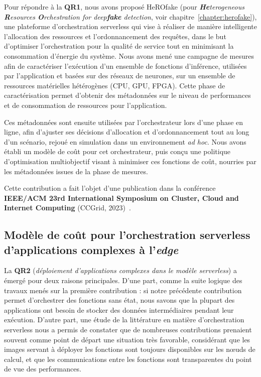 \sloppy Pour répondre à la \textbf{QR1}, nous avons proposé HeROfake (pour \textit{\textbf{He}terogeneous \textbf{R}esources \textbf{O}rchestration for deep\textbf{fake} detection}, voir chapitre~\ref{chapter:herofake}), une plateforme d'orchestration serverless qui vise à réaliser de manière intelligente l'allocation des ressources et l'ordonnancement des requêtes, dans le but d'optimiser l'orchestration pour la qualité de service tout en minimisant la consommation d'énergie du système. Nous avons mené une campagne de mesures afin de caractériser l'exécution d'un ensemble de fonctions d'inférence, utilisées par l'application et basées sur des réseaux de neurones, sur un ensemble de ressources matérielles hétérogènes (CPU, GPU, FPGA). Cette phase de caractérisation permet d'obtenir des métadonnées sur le niveau de performances et de consommation de ressources pour l'application.

Ces métadonnées sont ensuite utilisées par l'orchestrateur lors d'une phase en ligne, afin d'ajuster ses décisions d'allocation et d'ordonnancement tout au long d'un scénario, rejoué en simulation dans un environnement \textit{ad hoc}. Nous avons établi un modèle de coût pour cet orchestrateur, puis conçu une politique d'optimisation multiobjectif visant à minimiser ces fonctions de coût, nourries par les métadonnées issues de la phase de mesures.

Cette contribution a fait l'objet d'une publication dans la conférence \textbf{IEEE/ACM 23rd International Symposium on Cluster, Cloud and Internet Computing} (CCGrid, 2023)~\cite{herofake}.

\subsection{Modèle de coût pour l'orchestration serverless d'applications complexes à l'\textit{edge}}

La \textbf{QR2} (\textit{déploiement d'applications complexes dans le modèle serverless}) a émergé pour deux raisons principales. D'une part, comme la suite logique des travaux menés sur la première contribution : si notre précédente contribution permet d'orchestrer des fonctions sans état, nous savons que la plupart des applications ont besoin de stocker des données intermédiaires pendant leur exécution. D'autre part, une étude de la littérature en matière d'orchestration serverless nous a permis de constater que de nombreuses contributions prenaient souvent comme point de départ une situation très favorable, considérant que les images servant à déployer les fonctions sont toujours disponibles sur les nœuds de calcul, et que les communications entre les fonctions sont transparentes du point de vue des performances.

